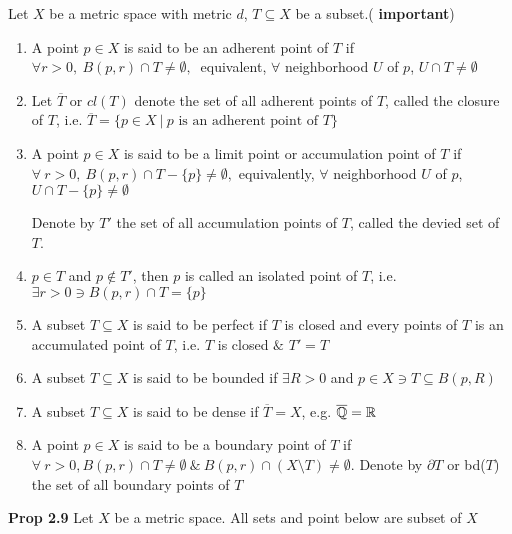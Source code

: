 \begin{defn}
	Let $X$ be a metric space with metric $d$, $T \subseteq X$ be a subset.(\textbf{\color{red} important})
	
	\begin{enumerate}[wide, label = \textbf{(\arabic*.)}]
		\item A point $p \in X$ is said to be an adherent point of $T$ if $\forall r > 0,~B(p,r)\cap T \neq \emptyset,~$ equivalent, $\forall$ neighborhood $U$ of $p$, $U \cap T \neq \emptyset$
		\item Let $\overline{T}$ or $cl(T)$ denote the set of all adherent points of $T$, called the closure of $T$, i.e. $\overline{T} = \{p \in X ~|~p \text{ is an adherent point of }T\}$
		\item A point $p \in X$ is said to be a limit point or accumulation point of $T$ if $\forall~r > 0,~B(p,r) \cap T - \{p\} \neq \emptyset,$ equivalently, $\forall$ neighborhood $U$ of $p$, $U \cap T - \{p\} \neq \emptyset$
		
		Denote by $T'$ the set of all accumulation points of $T$, called the devied set of $T$.
		\item $p \in T$ and $p \notin T'$, then $p$ is called an isolated point of $T$, i.e. $\exists r >0 \ni B(p,r)\cap T = \{p\}$
		\item A subset $T \subseteq X$ is said to be perfect if $T$ is closed and every points of $T$ is an accumulated point of $T$, i.e. $T$ is closed $\&$ $T' = T$
		\item A subset $T \subseteq X$ is said to be bounded if $\exists R>0$ and $p \in X \ni T \subseteq B(p,R)$
		\item A subset $T \subseteq X$ is said to be dense if $\overline{T} = X$, e.g. $\overline{\mathbb{Q}} = \mathbb{R}$
		\item A point $p \in X$ is said to be a boundary point of $T$ if $\forall~ r>0,B(p,r) \cap T \neq \emptyset ~\&~ B(p,r) \cap (X \setminus T) \neq \emptyset $. Denote by $\partial T$ or bd($T$) the set of all boundary points of $T$
	\end{enumerate}
\end{defn}

\textbf{Prop 2.9} Let $X$ be a metric space. All sets and point below are subset of $X$


